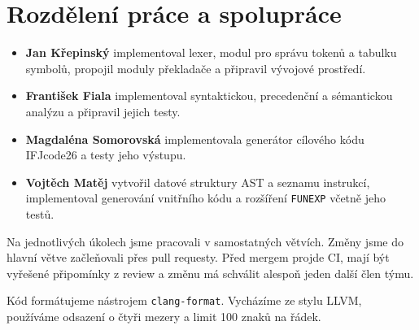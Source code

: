 \section{Rozdělení práce a spolupráce}

\begin{itemize}
  \item \textbf{Jan Křepinský} implementoval lexer, modul pro správu tokenů a tabulku symbolů, propojil moduly překladače a připravil vývojové prostředí.
  \item \textbf{František Fiala} implementoval syntaktickou, precedenční a sémantickou analýzu a připravil jejich testy.
  \item \textbf{Magdaléna Somorovská} implementovala generátor cílového kódu IFJcode26 a testy jeho výstupu.
  \item \textbf{Vojtěch Matěj} vytvořil datové struktury AST a seznamu instrukcí, implementoval generování vnitřního kódu a rozšíření \texttt{FUNEXP} včetně jeho testů.
\end{itemize}

Na jednotlivých úkolech jsme pracovali v samostatných větvích. Změny jsme do hlavní větve začleňovali přes pull requesty. Před mergem projde CI, mají být vyřešené připomínky z review a změnu má schválit alespoň jeden další člen týmu.

Kód formátujeme nástrojem \texttt{clang-format}. Vycházíme ze stylu LLVM, používáme odsazení o čtyři mezery a limit 100 znaků na řádek.